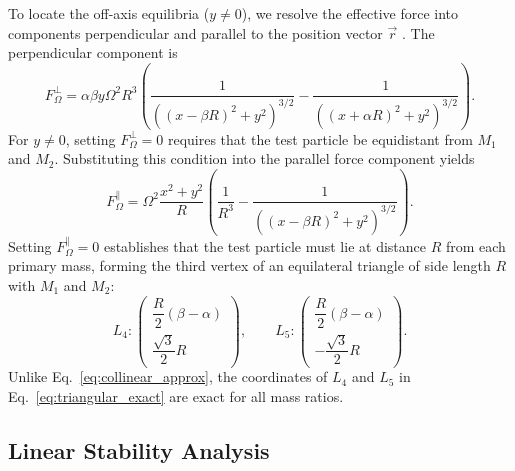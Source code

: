 \documentclass[12pt, letterpaper]{article}
\begin{document}
To locate the off-axis equilibria ($y \neq 0$), we resolve the effective force into components perpendicular and parallel to the position vector $\vec{r}$ \cite{cornish}. The perpendicular component is
$$
F_\Omega^\perp = \alpha \beta y \Omega^2 R^3 \left( \frac{1}{\left((x - \beta R)^2 + y^2\right)^{3/2}} - \frac{1}{\left((x + \alpha R)^2 + y^2\right)^{3/2}} \right).
$$
For $y \neq 0$, setting $F_\Omega^\perp = 0$ requires that the test particle be equidistant from $M_1$ and $M_2$. Substituting this condition into the parallel force component yields
$$
F_\Omega^\parallel = \Omega^2 \frac{x^2 + y^2}{R} \left( \frac{1}{R^3} - \frac{1}{\left((x - \beta R)^2 + y^2\right)^{3/2}} \right).
$$
Setting $F_\Omega^\parallel = 0$ establishes that the test particle must lie at distance $R$ from each primary mass, forming the third vertex of an equilateral triangle of side length $R$ with $M_1$ and $M_2$:
\begin{equation}
L_4: \begin{pmatrix} \dfrac{R}{2}(\beta - \alpha) \\[6pt] \dfrac{\sqrt{3}}{2}R \end{pmatrix}, \qquad
L_5: \begin{pmatrix} \dfrac{R}{2}(\beta - \alpha) \\[6pt] -\dfrac{\sqrt{3}}{2}R \end{pmatrix}.
\label{eq:triangular_exact}
\end{equation}
Unlike Eq.~\eqref{eq:collinear_approx}, the coordinates of $L_4$ and $L_5$ in Eq.~\eqref{eq:triangular_exact} are exact for all mass ratios.

\subsection{Linear Stability Analysis}
\end{document}
